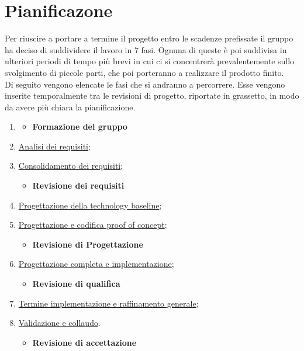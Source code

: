 \section{Pianificazone} \label{_pianificazione}
Per riuscire a portare a termine il progetto entro le scadenze prefissate il gruppo ha deciso di suddividere il lavoro in 7 fasi. Ognuna di queste è poi suddivisa in ulteriori periodi di tempo più brevi in cui ci si concentrerà prevalentemente sullo svolgimento di piccole parti, che poi porteranno a realizzare il prodotto finito.\\
Di seguito vengono elencate le fasi che si andranno a percorrere. Esse vengono inserite temporalmente tra le revisioni di progetto, riportate in grassetto, in modo da avere più chiara la pianificazione.
\begin{enumerate}
    \item []
          \begin{itemize}
              \item [] \textbf{Formazione del gruppo}
          \end{itemize}
    \item \hyperref[_pianificazioneAnalisiDeiRequisiti]{Analisi dei requisiti};
    \item \hyperref[_pianificazioneConsolidamentoDeiRequisiti]{Consolidamento dei requisiti};
          \begin{itemize}
              \item [] \textbf{Revisione dei requisiti}
          \end{itemize}
    \item \hyperref[_pianificazioneProgettazioneTechnologyBaseline]{Progettazione della technology baseline};
    \item \hyperref[_pianificazioneCodificaPoC]{Progettazione e codifica proof of concept};
          \begin{itemize}
              \item [] \textbf{Revisione di Progettazione}
          \end{itemize}
    \item \hyperref[_pianificazioneProgettazioneCompletaImplementazione]{Progettazione completa e implementazione};
          \begin{itemize}
              \item [] \textbf{Revisione di qualifica}
          \end{itemize}
    \item \hyperref[_pianificazioneTermineImplementazione]{Termine implementazione e raffinamento generale};
    \item \hyperref[_pianificazioneValidazioneCollaudo]{Validazione e collaudo}.
          \begin{itemize}
              \item [] \textbf{Revisione di accettazione}
          \end{itemize}
\end{enumerate}

